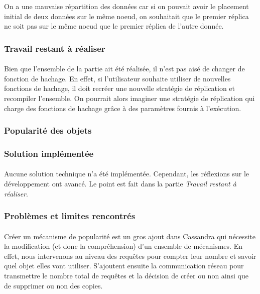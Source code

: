 \documentclass[12pt]{article}
\begin{document}
On a une mauvaise répartition des données car si on pouvait avoir le placement initial de deux données sur le même noeud, on souhaitait que le premier réplica ne soit pas sur le même noeud que le premier réplica de l'autre donnée.

\subsubsection*{Travail restant à réaliser}

\paragraph{}Bien que l'ensemble de la partie ait été réalisée, il n'est pas aisé de changer de fonction de hachage. En effet, si l'utilisateur souhaite utiliser de nouvelles fonctions de hachage, il doit recréer une nouvelle stratégie de réplication et recompiler l'ensemble. On pourrait alors imaginer une stratégie de réplication qui charge des fonctions de hachage grâce à des paramètres fournis à l'exécution.

\subsubsection{Popularité des objets}

\subsubsection*{Solution implémentée}

\paragraph{}Aucune solution technique n'a été implémentée. Cependant, les réflexions sur le développement ont avancé. Le point est fait dans la partie \textit{Travail restant à réaliser}.

\subsubsection*{Problèmes et limites rencontrés}

\paragraph{}Créer un mécanisme de popularité est un gros ajout dans Cassandra qui nécessite la modification (et donc la compréhension) d'un ensemble de mécanismes. En effet, nous intervenons au niveau des requêtes pour compter leur nombre et savoir quel objet elles vont utiliser. S'ajoutent ensuite la communication réseau pour transmettre le nombre total de requêtes et la décision de créer ou non ainsi que de supprimer ou non des copies.
\end{document}
